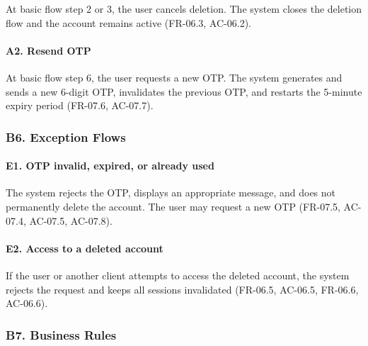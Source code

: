 \documentclass[12pt]{article}
\begin{document}
At basic flow step 2 or 3, the user cancels deletion. The system closes the deletion flow and the account remains active (FR-06.3, AC-06.2).
\par\medskip

\hypertarget{sec:a2-resend-otp}{}
\paragraph*{A2. Resend OTP}
\par\medskip

At basic flow step 6, the user requests a new OTP. The system generates and sends a new 6-digit OTP, invalidates the previous OTP, and restarts the 5-minute expiry period (FR-07.6, AC-07.7).
\par\medskip

\hypertarget{sec:b6-exception-flows}{}
\subsubsection*{B6. Exception Flows}
\par\medskip

\hypertarget{sec:e1-otp-invalid-expired-or-already-used}{}
\paragraph*{E1. OTP invalid, expired, or already used}
\par\medskip

The system rejects the OTP, displays an appropriate message, and does not permanently delete the account. The user may request a new OTP (FR-07.5, AC-07.4, AC-07.5, AC-07.8).
\par\medskip

\hypertarget{sec:e2-access-to-a-deleted-account}{}
\paragraph*{E2. Access to a deleted account}
\par\medskip

If the user or another client attempts to access the deleted account, the system rejects the request and keeps all sessions invalidated (FR-06.5, AC-06.5, FR-06.6, AC-06.6).
\par\medskip

\hypertarget{sec:b7-business-rules}{}
\subsubsection*{B7. Business Rules}
\par\medskip
\end{document}
